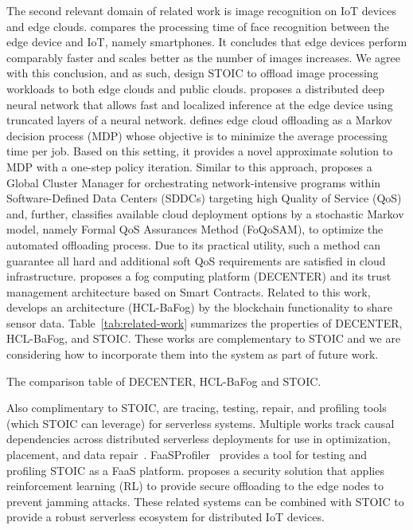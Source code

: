 The second relevant domain of related work is image recognition on IoT devices and edge clouds. \cite{ref:face} compares the processing time of face recognition between the edge device and IoT, namely smartphones. It concludes that edge devices perform comparably faster and scales better as the number of images increases. We agree with this conclusion, and as such, design STOIC to offload image processing workloads to both edge clouds and public clouds. \cite{ref:DDNN} proposes a distributed deep neural network that allows fast and localized inference at the edge device using truncated layers of a neural network. \cite{ref:cooperative} defines edge cloud offloading as a Markov decision process (MDP) whose objective is to minimize the average processing time per job. Based on this setting, it provides a novel approximate solution to MDP with a one-step policy iteration. Similar to this approach, \cite{ref:QoS-aware} proposes a Global Cluster Manager for orchestrating network-intensive programs within Software-Defined Data Centers (SDDCs) targeting high Quality of Service (QoS) and, further, \cite{ref:FQoS} classifies available cloud deployment options by a stochastic Markov model, namely Formal QoS Assurances Method (FoQoSAM), to optimize the automated offloading process. Due to its practical utility, such a method can guarantee all hard and additional soft QoS requirements are satisfied in cloud infrastructure. \cite{ref:trust} proposes a fog computing platform (DECENTER) and its trust management architecture based on Smart Contracts. Related to this work, \cite{ref:multichain} develops an architecture (HCL-BaFog) by the blockchain functionality to share sensor data. Table~\ref{tab:related-work} summarizes the properties of DECENTER, HCL-BaFog, and STOIC. These works are complementary to STOIC and we are considering how to incorporate them into the system as part of future work.

\begin{table}
\centering
\resizebox{390pt}{!}{
}
\caption{ The comparison table of DECENTER, HCL-BaFog and STOIC.
\label{tab:related-work}}
\end{table}

Also complimentary to STOIC, are tracing, testing, repair, and profiling tools (which STOIC can leverage) for serverless systems. Multiple works track causal dependencies across distributed serverless deployments for use in optimization, placement, and data repair~\cite{ref:repairdata,deptracing19,gammaray17,aws-xray}. FaaSProfiler~\cite{ref:profile} provides a tool for testing and profiling STOIC as a FaaS platform. \cite{ref:security} proposes a security solution that applies reinforcement learning (RL) to provide secure offloading to the edge nodes to prevent jamming attacks. These related systems can be combined with STOIC to provide a robust serverless ecosystem for distributed IoT devices.
